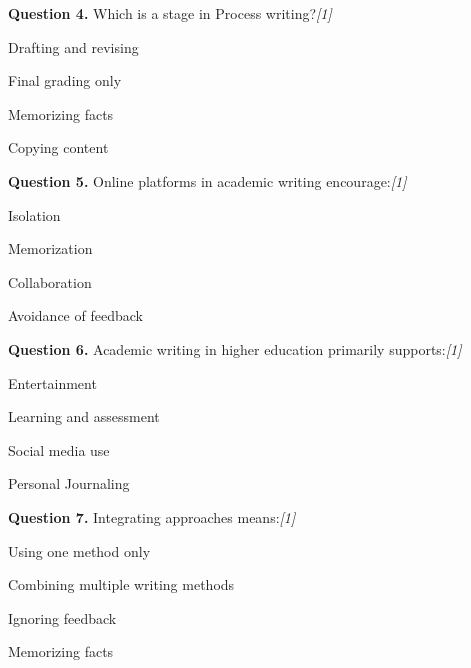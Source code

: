 \documentclass[11pt,a4paper]{article}
\newcommand{\pts}[1]{\hfill   \textit{[#1]}}
\begin{document}
\medskip




\noindent   \textbf{Question 4.} Which is a stage in Process writing?\pts{1}

\begin{parts}
  \item Drafting and revising
  \item Final grading only
  \item Memorizing facts
  \item Copying content
\end{parts}

\medskip




\noindent   \textbf{Question 5.} Online platforms in academic writing encourage:\pts{1}

\begin{parts}
  \item Isolation
  \item Memorization
  \item Collaboration
  \item Avoidance of feedback
\end{parts}

\medskip




\noindent   \textbf{Question 6.} Academic writing in higher education primarily supports:\pts{1}

\begin{parts}
  \item Entertainment
  \item Learning and assessment
  \item Social media use
  \item Personal Journaling
\end{parts}

\medskip




\noindent   \textbf{Question 7.} Integrating approaches means:\pts{1}

\begin{parts}
  \item Using one method only
  \item Combining multiple writing methods
  \item Ignoring feedback
  \item Memorizing facts
\end{parts}

\medskip
\end{document}
